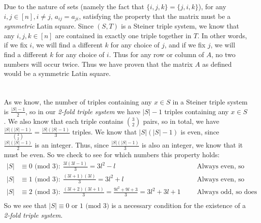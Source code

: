 \documentclass{article}
\begin{document}
\section{} %
Due to the nature of sets (namely the fact that $\{i,j,k\}=\{j,i,k\}$),
for any $i,j\in[n],i\neq j$, $a_{ij}=a_{ji}$, satisfying the property that the
matrix must be a \textit{symmetric} Latin square. Since $(S,T)$ is a Steiner
triple system, we know that any $i,j,k\in[n]$ are contained in exactly one
triple together in $T$. In other words, if we fix $i$, we will find a different
$k$ for any choice of $j$, and if we fix $j$, we will find a different $k$ for
any choice of $i$. Thus for any row or column of $A$, no two numbers will occur
twice. Thus we have proven that the matrix $A$ as defined would be a symmetric
Latin square.
\section{} %
As we know, the number of triples containing any $x\in S$ in a Steiner triple
system is $\frac{|S|-1}{2}$, so in our \textit{2-fold triple system} we have
$|S|-1$ triples containing any $x\in S$. We also know that each triple contains
$\binom{3}{2}$ pairs, so in total, we have $\frac{|S|(|S|-1)}{\binom{3}{2}}=
\frac{|S|(|S|-1)}{3}$ triples. We know that $|S|(|S|-1)$ is even, since
$\frac{|S|(|S|-1)}{2}$ is an integer. Thus, since $\frac{|S|(|S|-1)}{3}$ is also
an integer, we know that it must be even. So we check to see for which numbers
this property holds:
\begin{align*}
	|S|&\equiv0\text{ (mod 3)}:\ \frac{3l(3l-1)}{3}=3l^2-l&\qquad\text{ Always even, so holds.}\\
	|S|&\equiv1\text{ (mod 3)}:\ \frac{(3l+1)(3l)}{3}=3l^2+l&\qquad\text{ Always even, so holds}\\
	|S|&\equiv2\text{ (mod 3)}:\ \frac{(3l+2)(3l+1)}{3}=\frac{9l^2+9l+3}{3}=3l^2+3l+1&\qquad\text{ Always odd, so does not hold}\\
\end{align*}
So we see that $|S|\equiv0\text{ or }1\text{ (mod 3)}$ is a necessary condition for the
existence of a \textit{2-fold triple system}.
\end{document}
